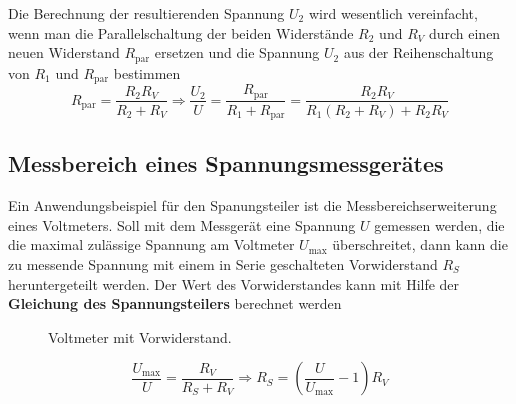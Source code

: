 \newline\newline 
Die Berechnung der resultierenden Spannung $U_2$ wird wesentlich vereinfacht, wenn man die Parallelschaltung der beiden Widerstände $R_2$ und $R_V$ durch einen neuen Widerstand $R_{\text{par}}$ ersetzen und die Spannung $U_2$ aus der Reihenschaltung von $R_1$ und $R_{\text{par}}$ bestimmen
\begin{equation}
\boxed{R_{\text{par}}=\dfrac{R_2R_V}{R_2+R_V} \Longrightarrow\dfrac{U_2}{U}=\dfrac{R_{\text{par}}}{R_1+R_{\text{par}}}=\dfrac{R_2R_V}{R_1\left(R_2+R_V\right)+R_2R_V}}
\end{equation}
\subsection{Messbereich eines Spannungsmessgerätes}
Ein Anwendungsbeispiel für den Spanungsteiler ist die Messbereichserweiterung eines Voltmeters. Soll mit dem Messgerät eine Spannung $U$ gemessen werden, die die maximal zulässige Spannung am Voltmeter $U_{\text{max}}$ überschreitet, dann kann die zu messende Spannung mit einem in Serie geschalteten Vorwiderstand $R_S$ heruntergeteilt werden. Der Wert des Vorwiderstandes kann mit Hilfe der \textbf{Gleichung des Spannungsteilers} berechnet werden
\begin{figure}[H]
\centering
\caption{Voltmeter mit Vorwiderstand.}
\label{fig_IIIq}
\end{figure}
\begin{equation}
\boxed{\dfrac{U_{\text{max}}}{U}=\dfrac{R_V}{R_S+R_V}\Longrightarrow R_S=\left(\dfrac{U}{U_{\text{max}}}-1\right)R_V}
\end{equation}
